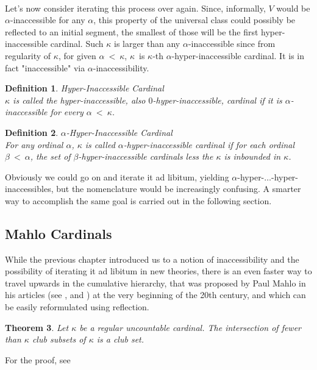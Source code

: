 \documentclass[12pt,a4paper]{article}
\newtheorem{theorem}{Theorem}[section]
\newtheorem{definition}[theorem]{Definition}
\begin{document}
\

Let's now consider iterating this process over again. Since, informally, $V$ would be $\alpha$-inaccessible for any $\alpha$, this property of the universal class could possibly be reflected to an initial segment, the smallest of those will be the first hyper-inaccessible cardinal. Such $\kappa$ is larger than any $\alpha$-inaccessible since from regularity of $\kappa$, for given $\alpha\ <\ \kappa$, $\kappa$ is $\kappa$-th $\alpha$-hyper-inaccessible cardinal. It is in fact "inaccessible" via $\alpha$-inaccessibility.

\begin{definition}{Hyper-Inaccessible Cardinal}\\
$\kappa$ is called the hyper-inaccessible, also $0$-hyper-inaccessible, cardinal if it is $\alpha$-inaccessible for every $\alpha\ <\ \kappa$.
\end{definition}

\begin{definition}{$\alpha$-Hyper-Inaccessible Cardinal}\\
For any ordinal $\alpha$, $\kappa$ is called $\alpha$-hyper-inaccessible cardinal if for each ordinal $\beta\ <\ \alpha$, the set of $\beta$-hyper-inaccessible cardinals less the $\kappa$ is inbounded in $\kappa$.
\end{definition}

Obviously we could go on and iterate it ad libitum, yielding $\alpha$-hyper-$\ldots$-hyper-inaccessibles, but the nomenclature would be increasingly confusing. A smarter way to accomplish the same goal is carried out in the following section.


\subsection{Mahlo Cardinals}

While the previous chapter introduced us to a notion of inaccessibility and the possibility of iterating it ad libitum in new theories, there is an even faster way to travel upwards in the cumulative hierarchy, that was proposed by Paul Mahlo in his articles (see \cite{Mahlo11}, \cite{Mahlo12} and \cite{Mahlo13}) at the very beginning of the 20th century, and which can be easily reformulated using reflection.

\begin{theorem}\label{club_intersection} 
Let $\kappa$ be a regular uncountable cardinal. The intersection of fewer than $\kappa$ club subsets of $\kappa$ is a club set.
\end{theorem}
For the proof, see \cite[Theorem 8.3]{JechBook}
\end{document}
